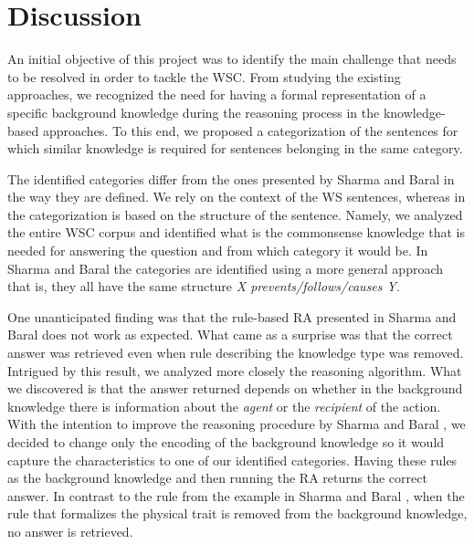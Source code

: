 \section{Discussion}
\label{section:Discussion}


An initial objective of this project was to identify the main challenge that needs to be resolved in order to tackle the WSC. From studying the existing approaches, we recognized the need for having a formal representation of a specific background knowledge during the reasoning process in the knowledge-based approaches. To this end, we proposed a categorization of the sentences for which similar knowledge is required for sentences belonging in the same category.

The identified categories differ from the ones presented by Sharma and Baral \cite{2018CommonsenseKT} in the way they are defined. We rely on the context of the WS sentences, whereas in \cite{2018CommonsenseKT} the categorization is based on the structure of the sentence. Namely, we analyzed the entire WSC corpus and identified what is the commonsense knowledge that is needed for answering the question and from which category it would be. In Sharma and Baral \cite{2018CommonsenseKT} the categories are identified using a more general approach that is, they all have the same structure \textit{X prevents/follows/causes Y}. 

One unanticipated finding was that the rule-based RA presented in Sharma and Baral \cite{2018CommonsenseKT} does not work as expected. What came as a surprise was that the correct answer was retrieved even when rule describing the knowledge type was removed. Intrigued by this result, we analyzed more closely the reasoning algorithm. What we discovered is that the answer returned depends on whether in the background knowledge there is information about the \textit{agent} or the \textit{recipient} of the action. With the intention to improve the reasoning procedure by  Sharma and Baral \cite{2018CommonsenseKT}, we decided to change only the encoding of the background knowledge so it would capture the characteristics to one of our identified categories. Having these rules as the background knowledge and then running the RA returns the correct answer. In contrast to the rule from the example in Sharma and Baral \cite{2018CommonsenseKT}, when the rule that formalizes the physical trait is removed from the background knowledge, no answer is retrieved. 

